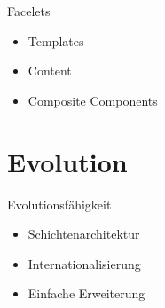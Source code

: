 \documentclass{beamer}
\begin{document}
    \begin{frame}{Facelets}
        \begin{itemize}
            \item Templates \pause
            \item Content \pause
            \item Composite Components
        \end{itemize}
    \end{frame}


    \section{Evolution}
    \begin{frame}{Evolutionsfähigkeit}
        \begin{itemize}
            \item Schichtenarchitektur
            \item Internationalisierung
            \item Einfache Erweiterung
        \end{itemize}
    \end{frame}
\end{document}
